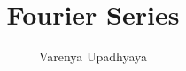 \documentclass[journal,12pt,twocolumn]{IEEEtran}
\begin{document}
\let\StandardTheFigure\thefigure
\renewcommand{\thefigure}{\theproblem}



\def\putbox#1#2#3{\makebox[0in][l]{\makebox[#1][l]{}\raisebox{\baselineskip}[0in][0in]{\raisebox{#2}[0in][0in]{#3}}}}
     \def\rightbox#1{\makebox[0in][r]{#1}}
     \def\centbox#1{\makebox[0in]{#1}}
     \def\topbox#1{\raisebox{-\baselineskip}[0in][0in]{#1}}
     \def\midbox#1{\raisebox{-0.5\baselineskip}[0in][0in]{#1}}

\vspace{3cm}

\title{ 
Fourier Series
}


%
%
%

\author{ Varenya Upadhyaya} %

% 
%
\end{document}

